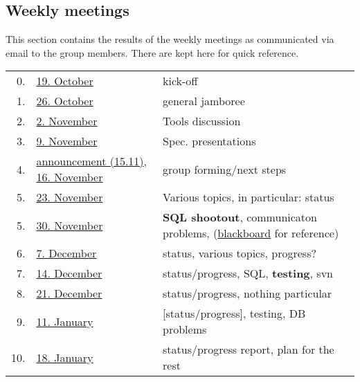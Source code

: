 
\subsection*{Weekly meetings}
\label{sec:meetings}


This section contains the results of the weekly meetings as communicated
via email to the group members. There are kept here for quick reference.




  \begin{table}[htbp]
    \centering
    \begin{tabular}[t]{r@{\quad}l@{\quad\quad}p{9cm}}
    \\\hline
    0.
    &
    \href{meetings/2004-10-19.txt}{19. October}
    &
    kick-off
    \\
    1.
    &
    \href{meetings/2004-10-26.txt}{26. October}
    &
    general jamboree
    \\
    2.
    &
    \href{meetings/2004-11-02.txt}{2. November}
    &
    Tools discussion
    \\
    3.
    &
    \href{meetings/2004-11-09.txt}{9. November}
    &
    Spec. presentations
    \\
    4.
    &
    \href{meetings/2004-11-15-a.txt}{announcement (15.11)},
    \href{meetings/2004-11-16.txt}{16. November}
    &
    group forming/next steps
    \\
    5.
    &
    \href{meetings/2004-11-23.txt}{23. November}
    &
    Various topics, in particular: status
    \\
    5.
    &
    \href{meetings/2004-11-30.txt}{30. November}
    &
    \textbf{SQL shootout}, communicaton problems,
    (\href{figures/db_photo.jpg}{blackboard} for reference)
    \\
    6.
    &
    \href{meetings/2004-12-07.txt}{7. December}
    &
    status, various topics, progress?
    \\
    7.
    &
    \href{meetings/2004-12-14.txt}{14. December}
    &
    status/progress, SQL, \textbf{testing}, svn
    \\
    8.
    &
    \href{meetings/2004-12-21.txt}{21. December}
    &
    status/progress, nothing particular
    \\\hline
    9.
    &
    \href{meetings/2005-01-11.txt}{11. January}
    &
    [status/progress], testing, DB problems
    \\
    10.
    &
    \href{meetings/2005-01-18.txt}{18. January}
    &
    status/progress report, plan for the rest
    \\

\end{tabular}
\end{table}
